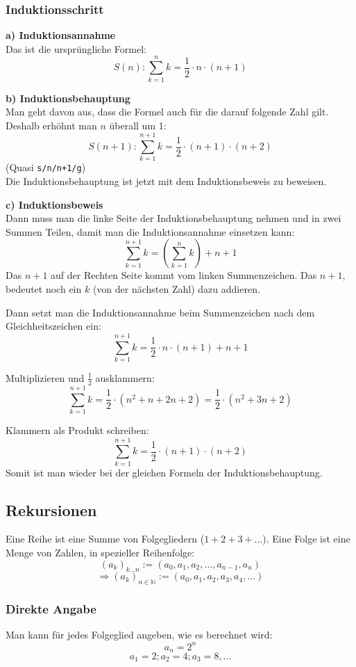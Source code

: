 \subsubsection{Induktionsschritt}
\textbf{a) Induktionsannahme} \\
Das ist die ursprüngliche Formel:
\[ S(n): \sum\limits_{k=1}^n k = \frac{1}{2} \cdot n \cdot (n + 1)\]

\textbf{b) Induktionsbehauptung} \\
Man geht davon aus, dass die Formel auch für die darauf folgende Zahl
gilt. Deshalb erhöhnt man $n$ überall um 1:
 \[ S(n + 1): \sum\limits_{k=1}^{n+1} k = \frac{1}{2} \cdot (n + 1) \cdot (n + 2)\]
(Quasi \texttt{s/n/n+1/g}) \\
Die Induktionsbehauptung ist jetzt mit dem Induktionsbeweis zu beweisen.

\textbf{c) Induktionsbeweis} \\
Dann muss man die linke Seite der Induktionsbehauptung nehmen und in zwei Summen Teilen,
damit man die Induktionsannahme einsetzen kann:
 \[ \sum\limits_{k=1}^{n+1} k = \left( \sum\limits_{k=1}^{n} k \right) + n + 1 \]
Das $n + 1$ auf der Rechten Seite kommt vom linken Summenzeichen.
Das $n + 1$, bedeutet noch ein $k$ (von der nächsten Zahl) dazu addieren.

Dann setzt man die Induktionsannahme beim Summenzeichen nach dem
Gleichheitszeichen ein:
 \[ \sum\limits_{k=1}^{n+1} k = \frac{1}{2} \cdot n \cdot (n + 1) + n + 1 \]

Multiplizieren und $\frac{1}{2}$ ausklammern:
 \[ \sum\limits_{k=1}^{n+1} k = \frac{1}{2} \cdot (n^2 + n + 2n + 2) =
 \frac{1}{2} \cdot (n^2 + 3n + 2) \]

Klammern als Produkt schreiben:
 \[ \sum\limits_{k=1}^{n+1} k = \frac{1}{2} \cdot (n + 1) \cdot (n + 2)\]
Somit ist man wieder bei der gleichen Formeln der Induktionsbehauptung.

\subsection{Rekursionen}
Eine Reihe ist eine Summe von Folgegliedern ($1 + 2 + 3 + ...$). Eine Folge ist eine Menge
von Zahlen, in spezieller Reihenfolge:
\[ (a_k)_{k...n} := (a_0, a_1, a_2, ..., a_{n-1}, a_n) \]
\[ \Rightarrow (a_k)_{n \in \mathbb{N}} := (a_0, a_1, a_2, a_3, a_4, ...) \]
\subsubsection{Direkte Angabe}
Man kann für jedes Folgeglied angeben, wie es berechnet wird:
\[ a_n = 2^n \]
\[ a_1 = 2; a_2 = 4; a_3 = 8, ... \]
